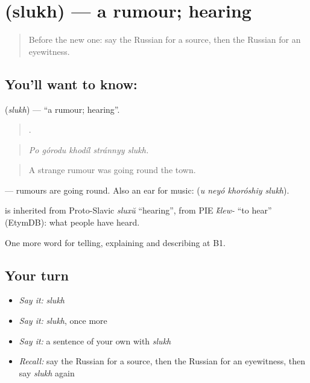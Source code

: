\section[\texorpdfstring{\ru{слух} (slukh)}{слух (slukh)}]{ (slukh) — a rumour; hearing}

\label{lesson:RU-C282-slukh}



\begin{quote}
Before the new one: say the Russian for a source, then the Russian for an eyewitness.
\end{quote}

\subsection*{You'll want to know: }
\textbf{} (\emph{slukh}) — \textquotedblleft{}a rumour; hearing\textquotedblright{}.

\begin{quote}
    .
\end{quote}

\begin{quote}
\emph{Po górodu khodíl stránnyy slukh.}
\end{quote}

\begin{quote}
A strange rumour was going round the town.
\end{quote}

\emph{ } — rumours are going round. Also an ear for music: \emph{   } (\emph{u neyó khoróshiy slukh}).

\begin{cousinweb}
\emph{} is inherited from Proto-Slavic \emph{sluxŭ} \textquotedblleft{}hearing\textquotedblright{}, from PIE \emph{\'{k}lew-} \textquotedblleft{}to hear\textquotedblright{} (EtymDB): what people have heard.
\end{cousinweb}

\begin{grammarlens}[title={What you've built}]
One more word for telling, explaining and describing at B1.
\end{grammarlens}

\subsection*{Your turn}
\begin{itemize}
\raggedright
  \item \emph{Say it:} \emph{slukh}
  \item \emph{Say it:} \emph{slukh}, once more
  \item \emph{Say it:} a sentence of your own with \emph{slukh}
  \item \emph{Recall:} say the Russian for a source, then the Russian for an eyewitness, then say \emph{slukh} again
\end{itemize}


